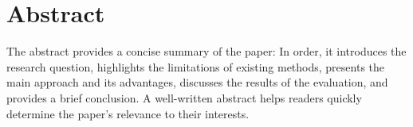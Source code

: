 
\chapter{Abstract}
\label{ch:abstract}

The abstract provides a concise summary of the paper:
In order, it introduces the research question, highlights the limitations of existing methods, presents the main approach and its advantages, discusses the results of the evaluation, and provides a brief conclusion.
A well-written abstract helps readers quickly determine the paper's relevance to their interests.







